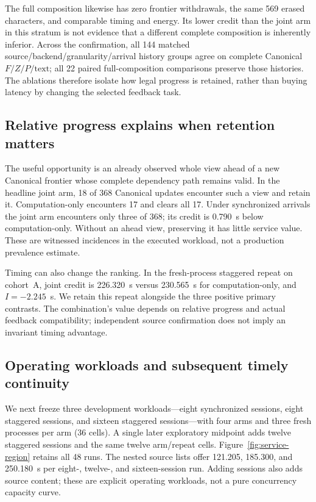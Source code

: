 The full composition likewise has zero frontier withdrawals, the same 569
erased characters, and comparable timing and energy. Its lower credit
than the joint arm in this stratum is not evidence that a different
complete composition is inherently inferior. Across the confirmation,
all 144 matched source/backend/granularity/arrival history groups agree
on complete Canonical $F/Z/P/\mathrm{text}$; all 22 paired full-composition
comparisons preserve those histories. The ablations therefore isolate
how legal progress is retained, rather than buying latency by changing
the selected feedback task.

\subsection{Relative progress explains when retention matters}
The useful opportunity is an already observed whole view ahead of a
new Canonical frontier whose complete dependency path remains valid.
In the headline joint arm, 18 of 368 Canonical updates encounter such
a view and retain it. Computation-only encounters 17 and clears all 17.
Under synchronized arrivals the joint arm encounters only three of
368; its credit is 0.790~s below computation-only. Without an ahead
view, preserving it has little service value. These are witnessed
incidences in the executed workload, not a production prevalence estimate.

Timing can also change the ranking. In the fresh-process staggered
repeat on cohort~A, joint credit is 226.320~s versus 230.565~s for
computation-only, and $I=-2.245$~s. We retain this repeat alongside
the three positive primary contrasts. The combination's value depends
on relative progress and actual feedback compatibility; independent
source confirmation does not imply an invariant timing advantage.

\subsection{Operating workloads and subsequent timely continuity}
We next freeze three development workloads---eight synchronized
sessions, eight staggered sessions, and sixteen staggered sessions---with
four arms and three fresh processes per arm (36 cells). A single later
exploratory midpoint adds twelve staggered sessions and the same twelve
arm/repeat cells. Figure~\ref{fig:service-region} retains all 48 runs.
The nested source lists offer 121.205, 185.300, and 250.180~s per
eight-, twelve-, and sixteen-session run. Adding sessions also adds
source content; these are explicit operating workloads, not a pure
concurrency capacity curve.

